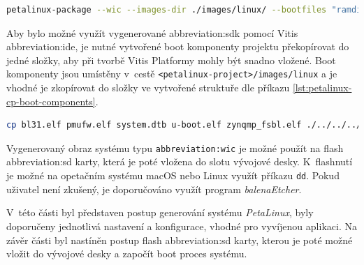 \documentclass[a4paper, twoside, 11pt]{article}
\begin{document}
\begin{lstlisting}[language={sh}, caption={Příkaz pro vytvoření obrazu systému, který bude vvyužit v~procesu flash SD Card (vybalování obrazu systému na SD kartu).}, label= {lst:petalinux-package-wic}, morekeywords={petalinux-build, petalinux-package, petalinux-config}]
petalinux-package --wic --images-dir ./images/linux/ --bootfiles "ramdisk.cpio.gz.u-boot,boot.scr,Image,system.dtb,system-zynqmp-sck-kr-g-revB.dtb" --disk-name "sda"\end{lstlisting}

	Aby bylo možné využít vygenerované \gls{abbreviation:sdk} pomocí Vitis \gls{abbreviation:ide}, je nutné vytvořené boot komponenty projektu překopírovat do jedné složky, aby při tvorbě Vitis Platformy mohly být snadno vložené. Boot komponenty jsou umístěny v~cestě \texttt{<petalinux-project>/images/linux} a je vhodné je zkopírovat do složky ve vytvořené struktuře dle příkazu \ref{lst:petalinux-cp-boot-components}.\par

	\begin{lstlisting}[language={sh}, caption={Příkaz pro kopírování boot komponent do složky dané strukturou projektu.}, label={lst:petalinux-cp-boot-components}, morekeywords={cp}]
cp bl31.elf pmufw.elf system.dtb u-boot.elf zynqmp_fsbl.elf ./../../../linux-files/pfm/boot/\end{lstlisting}

		Vygenerovaný obraz systému typu \texttt{\gls{abbreviation:wic}} je možné použít na flash \gls{abbreviation:sd} karty, která je poté vložena do slotu vývojové desky. K~flashnutí je možné na opetačním systému macOS nebo Linux využít příkazu \texttt{dd}. Pokud uživatel není zkušený, je doporučováno využít program \textit{balenaEtcher}.\par
		V~této části byl představen postup generování systému \textit{PetaLinux}, byly doporučeny jednotlivá nastavení a konfigurace, vhodné pro vyvíjenou aplikaci. Na závěr části byl nastíněn postup flash \gls{abbreviation:sd} karty, kterou je poté možné vložit do vývojové desky a započít boot proces systému.
\end{document}
